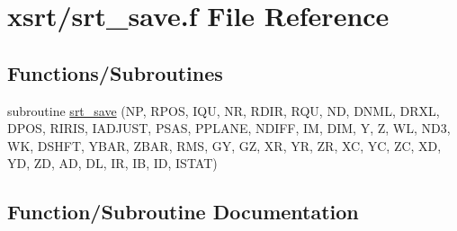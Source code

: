\hypertarget{srt__save_8f}{}\section{xsrt/srt\+\_\+save.f File Reference}
\label{srt__save_8f}
\subsection*{Functions/\+Subroutines}
\begin{DoxyCompactItemize}
\item 
subroutine \hyperlink{srt__save_8f_a2e27b2d0f9a8c88c6a3d118ecca51e63}{srt\+\_\+save} (NP, R\+P\+OS, I\+QU, NR, R\+D\+IR, R\+QU, ND, D\+N\+ML, D\+R\+XL, D\+P\+OS, R\+I\+R\+IS, I\+A\+D\+J\+U\+ST, P\+S\+AS, P\+P\+L\+A\+NE, N\+D\+I\+FF, IM, D\+IM, Y, Z, WL, N\+D3, WK, D\+S\+H\+FT, Y\+B\+AR, Z\+B\+AR, R\+MS, GY, GZ, XR, YR, ZR, XC, YC, ZC, XD, YD, ZD, AD, DL, IR, IB, ID, I\+S\+T\+AT)
\end{DoxyCompactItemize}


\subsection{Function/\+Subroutine Documentation}
\mbox{\label{srt__save_8f_a2e27b2d0f9a8c88c6a3d118ecca51e63}} 

